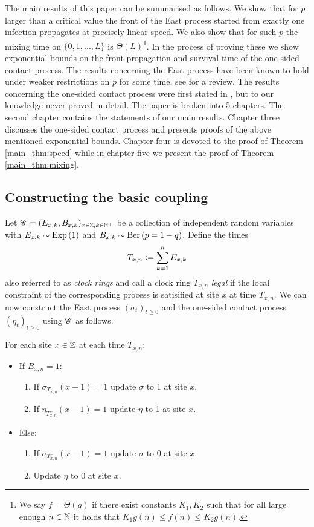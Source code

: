 The main results of this paper can be summarised as follows. We show that for $p$ larger than a critical value the front of the East process started from exactly one infection propagates at precisely linear speed. We also show that for such $p$ the mixing time on $\{ 0, 1, ..., L\}$ is $\Theta(L)$\footnote{We say $f = \Theta(g)$ if there exist constants $K_1, K_2$ such that for all large enough $n \in \mathbb{N}$ it holds that $K_1 g(n) \leq f(n) \leq K_2 g(n)$.}. In the process of proving these we show exponential bounds on the front propagation and survival time of the one-sided contact process. The results concerning the East process have been known to hold under weaker restrictions on $p$ for some time, see \cite{ganguly2015cutoff} for a review. The results concerning the one-sided contact process were first stated in \cite{durrett1983supercritical}, but to our knowledge never proved in detail. The paper is broken into 5 chapters. The second chapter contains the statements of our main results. Chapter three discusses the one-sided contact process and presents proofs of the above mentioned exponential bounds. Chapter four is devoted to the proof of Theorem \ref{main_thm:speed} while in chapter five we present the proof of Theorem \ref{main_thm:mixing}. 


\subsection{Constructing the basic coupling}
Let $\mathscr{C} = (E_{x,k}, B_{x,k})_{x \in \mathbb{Z}, k \in \mathbb{N}^+}$ be a collection of independent random variables with $E_{x,k} \sim \text{Exp} \left( 1 \right)$ and $B_{x,k} \sim \text{Ber} \left( p=1-q \right)$. Define the times 
\[
T_{x,n} \vcentcolon= \sum\limits_{k=1}^n E_{x,k}
\]
 also referred to as \textit{clock rings} and call a clock ring $T_{x,n}$ \textit{legal} if the local constraint of the corresponding process is satisified at site $x$ at time $T_{x,n}$. We can now construct the East process $(\sigma_t)_{t \geq 0}$ and the one-sided contact process $(\eta_t)_{t \geq 0}$ using $\mathscr{C}$ as follows. 
 
For each site $x \in \mathbb{Z}$ at each time $T_{x,n}$:
\begin{itemize}
  \item If $B_{x,n} = 1$:
  \begin{enumerate}
  	\item If $\sigma_{T^-_{x,n}} (x-1) = 1$ update $\sigma$ to 1 at site $x$. 
  	\item If $\eta_{T^-_{x,n}} (x-1) = 1$ update $\eta$ to 1 at site $x$. 
  \end{enumerate}
  \item Else:
  \begin{enumerate}
  	\item If $\sigma_{T^-_{x,n}} (x-1) = 1$ update $\sigma$ to 0 at site $x$. 
  	\item Update $\eta$ to 0 at site $x$. 
  \end{enumerate}
\end{itemize}

